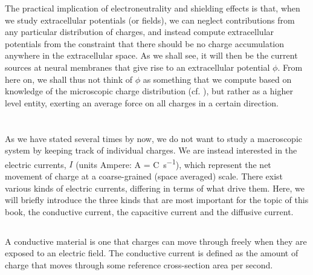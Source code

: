 The practical implication of electroneutrality and shielding effects is that, when we study extracellular potentials (or fields), we can neglect contributions from any particular distribution of charges, and instead compute extracellular potentials from the constraint that there should be no charge accumulation anywhere in the extracellular space. As we shall see, it will then be the current sources at neural membranes that give rise to an extracellular potential $\phi$. From here on, we shall thus not think of $\phi$ as something that we compute based on knowledge of the microscopic charge distribution (cf. ), but rather as a higher level entity, exerting an average force on all charges in a certain direction. 



\section{}
\label{sec:Basics:Current} 
As we have stated several times by now, we do not want to study a macroscopic system by keeping track of individual charges. We are instead interested in the electric currents, $I$ (units Ampere: \si{\ampere} = \si{\coulomb\per\second}), which represent the net movement of charge at a coarse-grained (space averaged) scale. There exist various kinds of electric currents, differing in terms of what drive them. Here, we will briefly introduce the three kinds that are most important for the topic of this book, the conductive current, the capacitive current and the diffusive current.

\subsection{}
\label{sec:Basics:ConductiveCurrent} 
A conductive material   is one that charges can move through freely when they are exposed to an electric field. The conductive current is defined as the amount of charge that moves through some reference cross-section area per second. 

